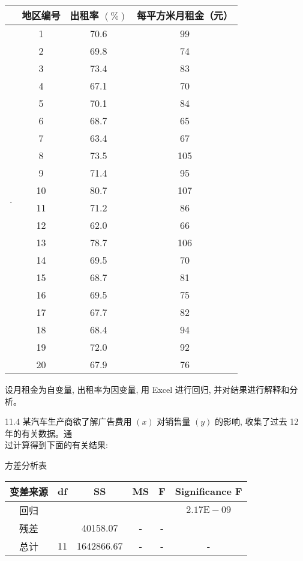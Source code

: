 \documentclass[10pt]{article}
\begin{document}
\begin{CJK*}{UTF8}{bsmi}
\begin{center}
\begin{tabular}{|c|c|c|c|}
\hline
 & 地区编号 & 出租率 $(\%)$ & 每平方米月租金（元） \\
\hline
\multirow{20}{*}{.} & 1 & 70.6 & 99 \\
\hline
 & 2 & 69.8 & 74 \\
\hline
 & 3 & 73.4 & 83 \\
\hline
 & 4 & 67.1 & 70 \\
\hline
 & 5 & 70.1 & 84 \\
\hline
 & 6 & 68.7 & 65 \\
\hline
 & 7 & 63.4 & 67 \\
\hline
 & 8 & 73.5 & 105 \\
\hline
 & 9 & 71.4 & 95 \\
\hline
 & 10 & 80.7 & 107 \\
\hline
 & 11 & 71.2 & 86 \\
\hline
 & 12 & 62.0 & 66 \\
\hline
 & 13 & 78.7 & 106 \\
\hline
 & 14 & 69.5 & 70 \\
\hline
 & 15 & 68.7 & 81 \\
\hline
 & 16 & 69.5 & 75 \\
\hline
 & 17 & 67.7 & 82 \\
\hline
 & 18 & 68.4 & 94 \\
\hline
 & 19 & 72.0 & 92 \\
\hline
 & 20 & 67.9 & 76 \\
\hline
\end{tabular}
\end{center}

设月租金为自变量, 出租率为因变量, 用 Excel 进行回归, 并对结果进行解释和分析。

11.4 某汽车生产商欲了解广告费用 $(x)$ 对销售量 $(y)$ 的影响, 收集了过去 12 年的有关数据。通\\
过计算得到下面的有关结果:

方差分析表

\begin{center}
\begin{tabular}{cccccc}
\hline
变差来源 & df & SS & MS & F & Significance F \\
\hline
回归 &  &  &  &  & $2.17 \mathrm{E}-09$ \\
残差 &  & 40158.07 & - & - &  \\
总计 & 11 & 1642866.67 & - & - & - \\
\hline
\end{tabular}
\end{center}


\end{CJK*}
\end{document}
